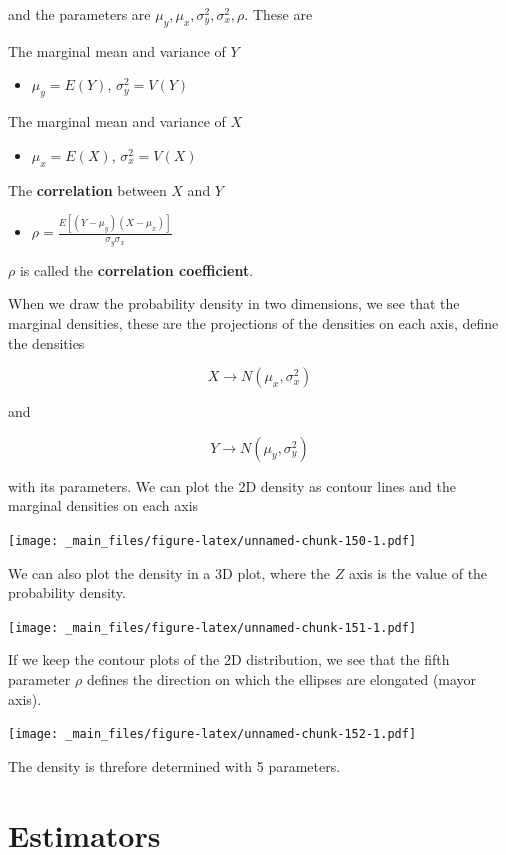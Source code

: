 \documentclass[
]{book}
\providecommand{\tightlist}{%
  \setlength{\itemsep}{0pt}\setlength{\parskip}{0pt}}
\begin{document}
and the parameters are \(\mu_y, \mu_x, \sigma^2_y, \sigma_x^2, \rho\). These are

The marginal mean and variance of \(Y\)

\begin{itemize}
\tightlist
\item
  \(\mu_y=E(Y)\), \(\sigma^2_y=V(Y)\)
\end{itemize}

The marginal mean and variance of \(X\)

\begin{itemize}
\tightlist
\item
  \(\mu_x=E(X)\), \(\sigma^2_x=V(X)\)
\end{itemize}

The \textbf{correlation} between \(X\) and \(Y\)

\begin{itemize}
\tightlist
\item
  \(\rho=\frac{E[(Y-\mu_y)(X-\mu_x)]}{\sigma_y\sigma_x}\)
\end{itemize}

\(\rho\) is called the \textbf{correlation coefficient}.

When we draw the probability density in two dimensions, we see that the marginal densities, these are the projections of the densities on each axis, define the densities

\[X \rightarrow N(\mu_x, \sigma_x^2)\]

and

\[Y \rightarrow N(\mu_y, \sigma_y^2)\]

with its parameters. We can plot the 2D density as contour lines and the marginal densities on each axis

\texttt{[image: \_main\_files/figure-latex/unnamed-chunk-150-1.pdf]}

We can also plot the density in a 3D plot, where the \(Z\) axis is the value of the probability density.

\texttt{[image: \_main\_files/figure-latex/unnamed-chunk-151-1.pdf]}

If we keep the contour plots of the 2D distribution, we see that the fifth parameter \(\rho\) defines the direction on which the ellipses are elongated (mayor axis).

\texttt{[image: \_main\_files/figure-latex/unnamed-chunk-152-1.pdf]}

The density is threfore determined with 5 parameters.

\hypertarget{estimators}{%
\section{Estimators}\label{estimators}}
\end{document}
